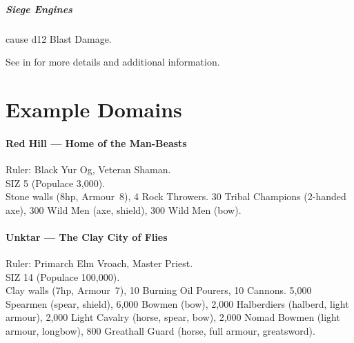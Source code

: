 \documentclass[itdr/core]{subfiles}
\begin{document}
\subparagraph{Siege Engines} cause d12 Blast Damage.

\begin{dbox}
	See \textbf{} in \textbf{} for more details and additional information.
\end{dbox}

\vfill

\section{Example Domains}

\paragraph{Red Hill --- Home of the Man-Beasts}
Ruler: Black Yur Og, Veteran Shaman.\\
SIZ 5 (Populace 3,000).\\
Stone walls (8hp, Armour~8), 4 Rock Throwers. 30 Tribal Champions (2-handed axe), 300 Wild Men (axe, shield), 300 Wild Men (bow).

\paragraph{Unktar --- The Clay City of Flies}
Ruler: Primarch Elm Vroach, Master Priest.\\
SIZ 14 (Populace 100,000).\\
Clay walls (7hp, Armour~7), 10 Burning Oil Pourers, 10 Cannons. 5,000 Spearmen (spear, shield), 6,000 Bowmen (bow), 2,000 Halberdiers (halberd, light armour), 2,000 Light Cavalry (horse, spear, bow), 2,000 Nomad Bowmen (light armour, longbow), 800 Greathall Guard (horse, full armour, greatsword).

\vfill
\end{document}

